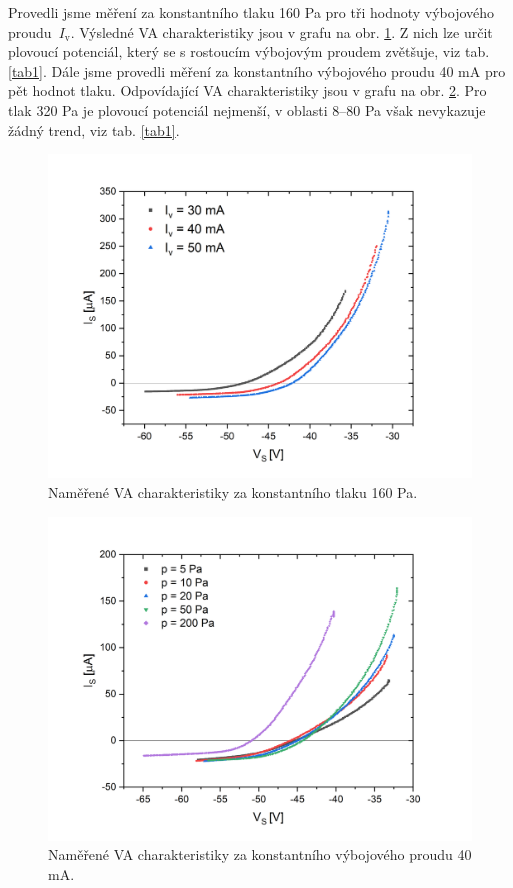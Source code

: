 \documentclass[a4paper,12pt]{article}
\begin{document}
Provedli jsme měření za konstantního tlaku 160 \si{\pascal} pro tři hodnoty výbojového proudu~$I_\text{v}$. Výsledné VA charakteristiky
jsou v grafu na obr. \ref{namerene012}. Z nich lze určit plovoucí potenciál, který se s rostoucím výbojovým proudem zvětšuje, viz tab.
\ref{tab1}. Dále jsme provedli měření za konstantního výbojového proudu 40 \si{\milli\ampere} pro pět hodnot tlaku. Odpovídající VA
charakteristiky jsou v grafu na obr. \ref{namerene34567}. Pro tlak 320 \si{\pascal} je plovoucí potenciál nejmenší, v oblasti 8--80
\si{\pascal} však nevykazuje žádný trend, viz tab. \ref{tab1}.

\begin{figure}[h!]
	\centering
	\includegraphics[width=145mm]{namerene012.png}
	\caption{Naměřené VA charakteristiky za konstantního tlaku 160 \si{\pascal}.}
	\label{namerene012}	
\end{figure}

\begin{figure}[h!]
	\centering
	\includegraphics[width=145mm]{namerene34567.png}
	\caption{Naměřené VA charakteristiky za konstantního výbojového proudu 40 \si{\milli\ampere}.}
	\label{namerene34567}
\end{figure}
\end{document}
